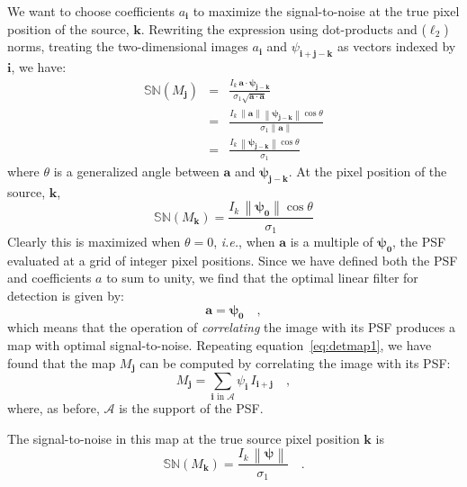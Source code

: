 \documentclass[11pt,letterpaper,linenumbers]{aastex7}
\newcommand{\equationname}{equation}
\newcommand{\eqnref}[1]{\mbox{\equationname~\ref{#1}}}
\newcommand{\latin}[1]{\emph{#1}}
\newcommand{\ie}{\latin{i.e.}}
\newcommand{\psf}{\psi}
\newcommand{\psfat}[1]{\psf_{#1}}
\newcommand{\signoise}{[S/N]}
\newcommand{\snr}[1]{\mathbb{SN}(#1)}
\newcommand{\norm}[1]{\left\lVert #1 \right\rVert}
\renewcommand{\vec}[1]{\boldsymbol{#1}}
\newcommand{\avec}{\vec{a}}
\newcommand{\ivec}{\vec{i}}
\newcommand{\jvec}{\vec{j}}
\newcommand{\kvec}{\vec{k}}
\newcommand{\iina}{\ivec \,\, \mathrm{in} \,\, \mathcal{A}}
\begin{document}
We want to choose coefficients $a_{\ivec}$ to maximize the 
signal-to-noise at the true pixel position of the source,
$\kvec$.  Rewriting the expression using dot-products and
($\ell_2$) norms, treating the two-dimensional images
$a_{\ivec}$ and $\psfat{\ivec + \jvec - \kvec}$ as vectors indexed by
$\ivec$, we have:
\begin{eqnarray}
  \snr{M_{\jvec}} &=& \frac{I_k \, \avec \cdot \bm{\psfat{j-k}}}{\sigma_1 \sqrt{\avec \cdot \avec}} \label{eqn:psfdotprod} \\
 &=& \frac{I_k \, \norm{\avec} \norm{\bm{\psfat{j-k}}} \cos \theta}{\sigma_1 \norm{\avec}} \\
 &=& \frac{I_k \, \norm{\bm{\psfat{j-k}}} \cos \theta}{\sigma_1}
\end{eqnarray}
where $\theta$ is a generalized angle between $\avec$ and $\bm{\psfat{j-k}}$.
At the pixel position of the source, $\kvec$,
\begin{equation}
\snr{M_{\kvec}} = \frac{I_k \, \norm{\bm{\psfat{0}}} \cos \theta}{\sigma_1}
\label{eqn:sndsingle}
\end{equation}
Clearly this is maximized when $\theta = 0$, \ie, when $\avec$ is a
multiple of $\bm{\psfat{0}}$, the PSF evaluated at a grid of integer
pixel positions.  Since we have defined both the PSF and coefficients
$a$ to sum to unity, we find that the optimal linear filter for
detection is given by:
\begin{equation}
\avec = \bm{\psfat{0}} \quad ,
\end{equation}
which means that the operation of \emph{correlating} the image with
its PSF produces a map with optimal signal-to-noise.  Repeating
\eqnref{eq:detmap1}, we have found that the map $M_{\jvec}$ can
be computed by correlating the image with its PSF:
\begin{equation}
M_{\jvec} = \sum_{\iina} \psfat{\ivec} \, I_{\ivec + \jvec} \quad ,
\end{equation}
where, as before, $\mathcal{A}$ is the support of the PSF.

The signal-to-noise in this map at the true source pixel
position $\kvec$ is
\begin{equation}
\snr{M_{\kvec}} = \frac{I_k \, \norm{\bm{\psfat{}}}}{\sigma_1} \quad .
\end{equation}
\end{document}
